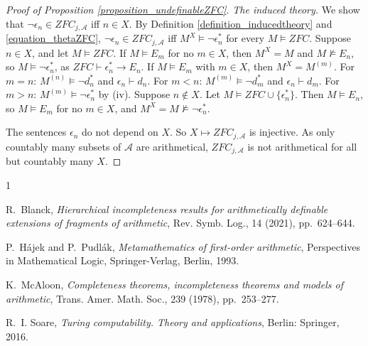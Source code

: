 \documentclass{amsart}  %
\numberwithin{equation}{section}
\theoremstyle{definition}
\theoremstyle{remark}
\begin{document}
\begin{proof} [Proof of Proposition \ref{proposition_undefinableZFC}]
\emph{The induced theory.} We show that $\neg \epsilon _{n} \in ZFC _{j, \mathcal{A}}$ iff $n \in X$. By Definition \ref{definition_inducedtheory} and \eqref{equation_thetaZFC}, $\neg \epsilon _{n} \in ZFC _{j, \mathcal{A}}$ iff $M ^{X} \models \neg \epsilon _{n} ^{\ast}$ for every $M \models ZFC$. Suppose $n \in X$, and let $M \models ZFC$. If $M \models E _{m}$ for no $m \in X$, then $M ^{X} = M$ and $M \not \models E _{n}$, so $M \models \neg \epsilon _{n} ^{\ast}$, as $ZFC \vdash \epsilon _{n} ^{\ast} \to E _{n}$. If $M \models E _{m}$ with $m \in X$, then $M ^{X} = M ^{(m)}$. For $m = n$: $M ^{(n)} \models \neg d _{n} ^{\ast}$ and $\epsilon _{n} \vdash d _{n}$. For $m < n$: $M ^{(m)} \models \neg d _{m} ^{\ast}$ and $\epsilon _{n} \vdash d _{m}$. For $m > n$: $M ^{(m)} \models \neg \epsilon _{n} ^{\ast}$ by (iv). Suppose $n \notin X$. Let $M \models ZFC \cup \{\epsilon _{n} ^{\ast}\}$. Then $M \models E _{n}$, so $M \models E _{m}$ for no $m \in X$, and $M ^{X} = M \not \models \neg \epsilon _{n} ^{\ast}$.

The sentences $\epsilon _{n}$ do not depend on $X$. So $X \mapsto ZFC _{j, \mathcal{A}}$ is injective. As only countably many subsets of $\mathcal{A}$ are arithmetical, $ZFC _{j, \mathcal{A}}$ is not arithmetical for all but countably many $X$.
\end{proof}

\def\cprime{$'$}
\begin{thebibliography}{1}

{\sc R.~Blanck}, {\em Hierarchical incompleteness results for arithmetically
  definable extensions of fragments of arithmetic}, Rev. Symb. Log., 14 (2021),
  pp.~624--644.

{\sc P.~H{\'a}jek and P.~Pudl{\'a}k}, {\em Metamathematics of first-order
  arithmetic}, Perspectives in Mathematical Logic, Springer-Verlag, Berlin,
  1993.

{\sc K.~McAloon}, {\em Completeness theorems, incompleteness theorems and
  models of arithmetic}, Trans. Amer. Math. Soc., 239 (1978), pp.~253--277.

{\sc R.~I. {Soare}}, {\em {Turing computability. Theory and applications}},
  Berlin: Springer, 2016.

\end{thebibliography}
\end{document}
